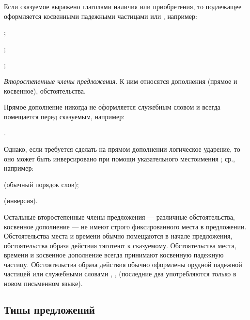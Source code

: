 Если сказуемое выражено глаголами наличия или приобретения, то подлежащее оформляется косвенными падежными частицами  или , например:
\begin{prfsample}
	\item {};
	\item {};
	\item {};
\end{prfsample}

\emph{Второстепенные члены предложения}. К ним относятся дополнения (прямое и косвенное), обстоятельства.

Прямое дополнение никогда не оформляется служебным словом и всегда помещается перед сказуемым, например:
\begin{prfsample}
	\item {}.
\end{prfsample}
Однако, если требуется сделать на прямом дополнении логическое ударение, то оно может быть инверсировано при помощи указательного местоимения ; ср., например:
\begin{prfsample}
	\item {} (обычный порядок слов);
	\item {} (инверсия).
\end{prfsample}

Остальные второстепенные члены предложения --- различные обстоятельства, косвенное дополнение --- не имеют строго фиксированного места в предложении. Обстоятельства места и времени обычно помещаются в начале предложения, обстоятельства образа действия тяготеют к сказуемому. Обстоятельства места, времени и косвенное дополнение всегда принимают косвенную падежную частицу.
Обстоятельства образа действия обычно оформлены орудной падежной частицей или служебными словами , ,  (последние два употребляются только в новом письменном языке).

\subsection{Типы предложений}

